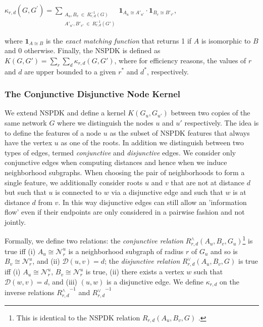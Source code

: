 \documentclass{esannV2}
\begin{document}
\begin{center}
$\kappa_{r,d}(G,G^{'}) = 
\!\!\!\!\!\!\!\!\!\!\!\! 
\sum\limits_{\substack{A_u, B_v \ \in \ R_{r,d}^{-1}(G) \\ 
{A'}_{u'}, {B'}_{v'} \ \in \ R_{r,d}^{-1}(G')
}} \!\!\!\!\!\!\!\!\!\!\!\!  { { \textbf{1}_{A_{u} \cong A'_{u'}}} \cdot {
\textbf{1}_{B_{v} \cong B'_{v'}}} }$, 
\end{center} 


where $\textbf{1}_{A \cong
B}$ is the \textit{exact matching function} that returns 1 if $A$ is
isomorphic to $B$ and 0 otherwise.  Finally, the NSPDK is defined as $K(G,G')
= \sum\limits_{r}{\sum\limits_{d}{\kappa_{r,d}(G,G')}}$, where for efficiency
reasons, the values of $r$ and $d$ are upper bounded to a given $r^*$ and
$d^*$, respectively.

\subsubsection{The Conjunctive Disjunctive Node Kernel}

We extend NSPDK and define a kernel $K(G_u,G_{u'})$ between two copies of the
same network $G$ where we distinguish the nodes $u$ and $u'$ respectively. The
idea is to define the features of a node $u$ as the subset of NSPDK features
that always have the vertex $u$ as one of the roots. In addition we
distinguish between two types of edges, termed {\em conjunctive} and {\em
disjunctive} edges. We consider only conjunctive edges when computing
distances and hence when we induce neighborhood subgraphs. When choosing the
pair of neighborhoods to form a single feature, we additionally consider roots
$u$ and $v$ that are not at distance $d$ but such that $u$ is connected to $w$
via a disjunctive edge and such that $w$ is at distance $d$ from $v$. In this
way disjunctive edges can still allow an 'information flow' even if their
endpoints are only considered in a pairwise fashion and not jointly.

Formally, we define two relations: the \textit{conjunctive relation}
$R^{\wedge}_{r,d}(A_u, B_v, G_u)$\footnote{This is identical to the NSPDK relation $R_{r,d}(A_u, B_v, G)$ .}  is true iff (i) $A_u \cong \mathcal{N}_r^u$ is a neighborhood subgraph of radius $r$ of $G_u$ and so is $B_v \cong \mathcal{N}_r^u$,  and (ii) $\mathcal{D}(u,v)= d$; the
\textit{disjunctive relation} $R_{r,d}^{\vee}(A_u, B_v, G)$ is true iff (i)  $A_u \cong \mathcal{N}_r^u$, $B_v \cong \mathcal{N}_r^u$
is true, (ii) there
exists a vertex $w$ such that $\mathcal{D}(w,v)= d$, and (iii) $(u,w)$ is a
disjunctive edge. We define $\kappa_{r,d}$ on the  inverse relations ${R^{\wedge}_{r,d}}^{ -1}$
and ${R^{\vee}_{r,d}}^{ -1}$
\end{document}
